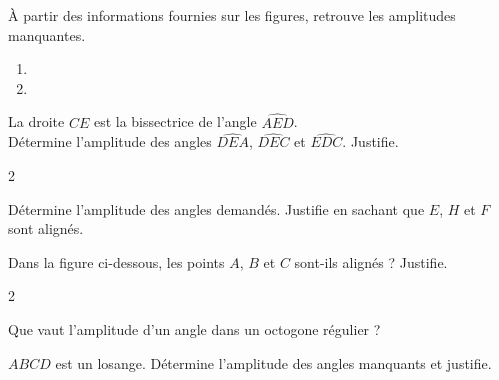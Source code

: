 \documentclass[../../syllabus_2.tex]{subfiles}
\begin{document}
\begin{exercise}
    À partir des informations fournies sur les figures, retrouve les amplitudes manquantes.
    \begin{enumerate}[cols=2]
        \item 
        \item 
    \end{enumerate}
\end{exercise}

\begin{exercise}
    La droite $CE$ est la bissectrice de l'angle $\widehat{AED}$.\\
    Détermine l'amplitude des angles $\widehat{DEA}$, $\widehat{DEC}$ et $\widehat{EDC}$. Justifie.
    \begin{center}
        
    \end{center}
\end{exercise}
\newpage

\setlength{\columnsep}{20pt}
\begin{multicols}{2}
    \begin{exercise}
        Détermine l'amplitude des angles demandés. Justifie en sachant que $E$, $H$ et $F$ sont alignés.
        \begin{center}
            
        \end{center}
    \end{exercise}

    \begin{exercise}
        Dans la figure ci-dessous, les points $A$, $B$ et $C$ sont-ils alignés ? Justifie.
        \begin{center}
            
        \end{center}
    \end{exercise}
\end{multicols}

\begin{multicols}{2}
    \begin{exercise}
        Que vaut l'amplitude d'un angle dans un octogone régulier ?
    \end{exercise}
    \columnbreak

    \begin{exercise}
        $ABCD$ est un losange. Détermine l'amplitude des angles manquants et justifie.
        \begin{center}
            
        \end{center}
    \end{exercise}
\end{multicols}
\setlength{\columnsep}{10pt}
\end{document}
